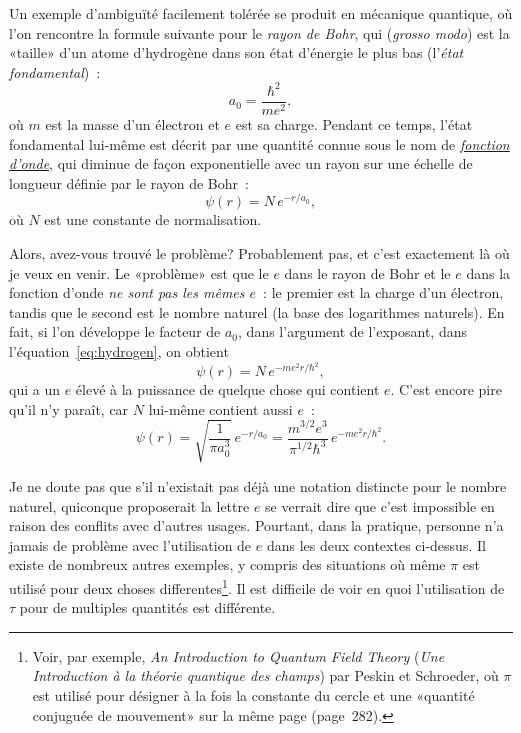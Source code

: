 Un exemple d'ambiguïté facilement tolérée se produit en mécanique quantique, où
l'on rencontre la formule suivante pour le \emph{rayon de Bohr}, qui (\emph{grosso
modo}) est la «\ns taille\ns » d'un atome d'hydrogène dans son état d'énergie le
plus bas (l'\emph{état fondamental})~:
\[
a_0 = \frac{\hbar^2}{m e^2},
\]
où $m$ est la masse d'un électron et $e$ est sa charge. Pendant ce temps, l'état
fondamental lui-même est décrit par une quantité connue sous le nom de
\href{https://fr.wikipedia.org/wiki/Fonction_d%27onde}{\emph{fonction d'onde}},
qui diminue de façon exponentielle avec un rayon sur une échelle de longueur
définie par le rayon de Bohr~:
\begin{equation}
\label{eq:hydrogen}
\psi(r) = N\,e^{-r/a_0},
\end{equation}
où $N$ est une constante de normalisation.

Alors, avez-vous trouvé le problème\ns? Probablement pas, et c'est exactement là où je veux en
venir. Le «\ns problème\ns » est que le $e$ dans le rayon de Bohr et le $e$ dans la
fonction d'onde \emph{ne sont pas les mêmes $e$}~: le premier est la charge
d'un électron, tandis que le second est le nombre naturel (la base des logarithmes
naturels). En fait, si l'on développe le facteur de $a_0$, dans l'argument de
l'exposant, dans l'équation~\eqref{eq:hydrogen}, on obtient
\[
\psi(r) = N\,e^{-m e^2 r/\hbar^2},
\]
qui a un $e$ élevé à la puissance de quelque chose qui contient $e$. C'est
encore pire qu'il n'y paraît, car $N$ lui-même contient aussi $e$~:
\[
\psi(r) = \sqrt{\frac{1}{\pi a_0^3}}\,e^{-r/a_0} =
\frac{m^{3/2} e^3}{\pi^{1/2} \hbar^3}\,e^{-m e^2 r/\hbar^2}.
\]

Je ne doute pas que s'il n'existait pas déjà une notation distincte pour le
nombre naturel, quiconque proposerait la lettre $e$ se verrait dire que
c'est impossible en raison des conflits avec d'autres usages. Pourtant,
dans la pratique, personne n'a jamais de problème avec l'utilisation de $e$ dans
les deux contextes ci-dessus. Il existe de nombreux autres exemples, y compris
des situations où même $\pi$ est utilisé pour deux choses
differentes\ns\footnote{Voir, par exemple, \emph{An Introduction to Quantum Field
Theory} (\emph{Une Introduction à la théorie quantique des champs}) par Peskin
et Schroeder, où $\pi$ est utilisé pour désigner à la fois la constante du
cercle et une «\ns quantité conjuguée de mouvement\ns » sur la même page
(page~282).}. Il est difficile de voir en quoi l'utilisation de $\tau$ pour
de multiples quantités est différente.


